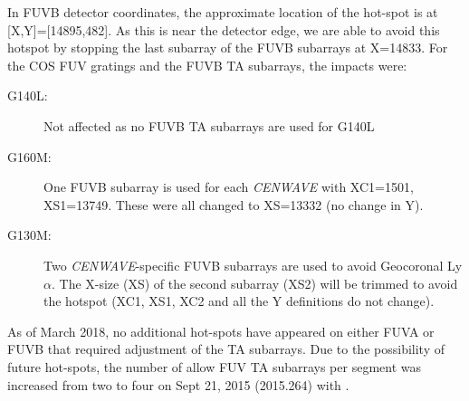 In FUVB detector coordinates, the approximate location of the hot-spot is at [X,Y]=[14895,482]. As this is near the detector edge, we are able to avoid this hotspot by stopping the last subarray of the FUVB subarrays at X=14833.
For the COS FUV gratings and the FUVB TA subarrays, the impacts were:\\
\begin{description}
	\item[G140L:] Not affected as no FUVB TA subarrays are used for G140L
	\item[G160M:] One FUVB subarray is used for each \textit{CENWAVE} with XC1=1501, XS1=13749. These were all changed to XS=13332 (no change in Y).
	\item[G130M:] Two \textit{CENWAVE}-specific FUVB subarrays are used to avoid Geocoronal Ly$\alpha$. The X-size (XS) of the second subarray (XS2) will be trimmed to avoid the hotspot (XC1, XS1, XC2 and all the Y definitions do not change).
\end{description}

As of March 2018, no additional hot-spots have appeared on either FUVA or FUVB that required adjustment of the TA subarrays.
Due to the possibility of future hot-spots, the number of allow FUV TA subarrays per segment was increased from two to four on  Sept 21, 2015 (2015.264) with .
